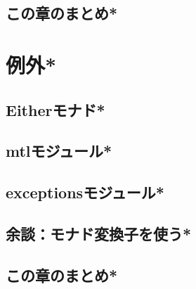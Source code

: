 \documentclass[a5paper,twoside,fleqn,draft]{jsbook}
\begin{document}
\section{この章のまとめ*}

\chapter{例外*}
\section{Eitherモナド*}
\section{mtlモジュール*}
\section{exceptionsモジュール*}
\section{余談：モナド変換子を使う*}
\section{この章のまとめ*}


\end{document}
